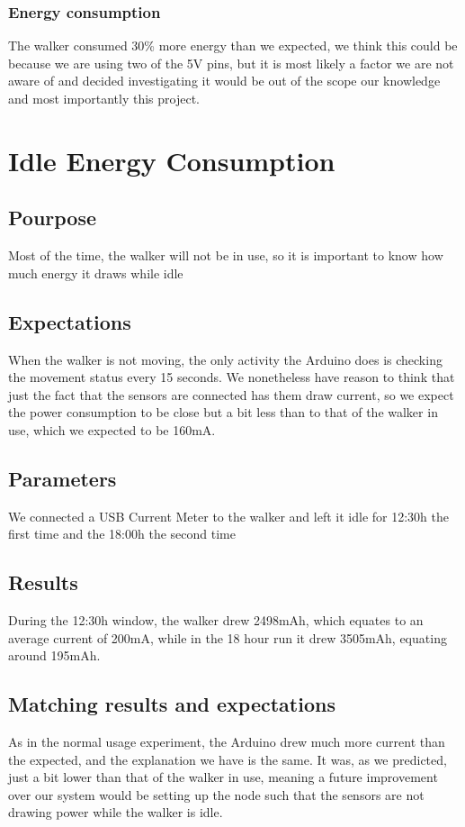 		\subsubsection{Energy consumption}
			The walker consumed 30\% more energy than we expected, we think this could be because we are using two of the 5V pins, but it is most likely a factor we are not aware of and decided investigating it would be out of the scope our knowledge and most importantly this project.

\section{Idle Energy Consumption}

	\subsection*{Pourpose}
		Most of the time, the walker will not be in use, so it is important to know how much energy it draws while idle
	\subsection*{Expectations}
		When the walker is not moving, the only activity the Arduino does is checking the movement status every 15 seconds. We nonetheless have reason to think that just the fact that the sensors are connected has them draw current, so we expect the power consumption to be close but a bit less than to that of the walker in use, which we expected to be 160mA.
	\subsection*{Parameters}
		We connected a USB Current Meter to the walker and left it idle for 12:30h the first time and the 18:00h the second time
	\subsection*{Results}
		During the 12:30h window, the walker drew 2498mAh, which equates to an average current of 200mA, while in the 18 hour run it drew 3505mAh, equating around 195mAh.
	\subsection*{Matching results and expectations}
		As in the normal usage experiment, the Arduino drew much more current than the expected, and the explanation we have is the same. It was, as we predicted, just a bit lower than that of the walker in use, meaning a future improvement over our system would be setting up the node such that the sensors are not drawing power while the walker is idle.

